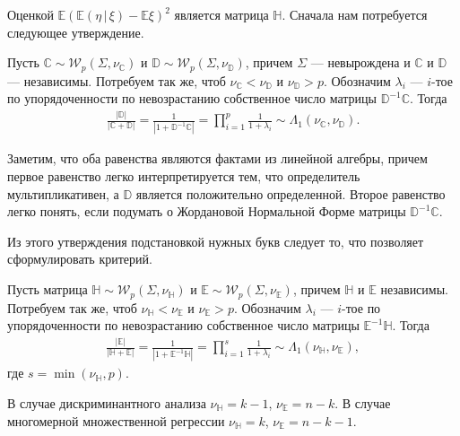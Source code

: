 Оценкой $\mathbb E(\mathbb E(\eta\, | \, \xi) - \mathbb E \xi)^2$ является матрица $\mathbb H$.
Сначала нам потребуется следующее утверждение.
\begin{thm}
    \label{Wilks-thm-gen}
    Пусть $\mathbb C \sim \mathcal W_p(\Sigma, \nu_\mathbb C)$ и
    $\mathbb D \sim \mathcal W_p(\Sigma, \nu_\mathbb D)$, причем $\Sigma$ --- невырождена
    и $\mathbb C$ и $\mathbb D$ --- независимы.
    Потребуем так же, чтоб $\nu_\mathbb C < \nu_\mathbb D$ и $\nu_\mathbb D > p$.
    Обозначим $\lambda_i$ --- $i$-тое по упорядоченности по невозрастанию собственное число матрицы $\mathbb D^{-1} \mathbb C$.
    Тогда
    \begin{gather*}
        \mathbb {\frac{|D|}{| C + D |}} = \frac{1}{| 1 + \mathbb D^{-1} \mathbb C|} = \prod_{i=1}^p {\frac{1}{1 + \lambda_i}}
    \sim \Lambda_1(\nu_\mathbb C, \nu_\mathbb D).
    \end{gather*}
\end{thm}

Заметим, что оба равенства являются фактами из линейной алгебры, причем первое равенство легко интерпретируется тем, что
определитель мультипликативен, а $\mathbb D$ является положительно определенной. Второе равенство легко понять, если подумать
о Жордановой Нормальной Форме матрицы $\mathbb D^{-1} \mathbb C$.

Из этого утверждения подстановкой нужных букв следует то, что позволяет сформулировать критерий.

\begin{thm}
    \label{Wilks-thm-conc}
    Пусть матрица $\mathbb H \sim \mathcal W_p(\Sigma, \nu_\mathbb H)$ и
    $\mathbb E \sim \mathcal W_p(\Sigma, \nu_\mathbb E)$, причем $\mathbb H$ и $\mathbb E$ независимы.
    Потребуем так же, чтоб $\nu_\mathbb H < \nu_\mathbb E$ и $\nu_\mathbb E > p$.
    Обозначим $\lambda_i$ --- $i$-тое по упорядоченности по невозрастанию собственное число матрицы $\mathbb E^{-1} \mathbb H$.
    Тогда
    \begin{gather*}
       \mathbb {\frac{|E|}{| H + E |}} = \frac{1}{| 1 + \mathbb E^{-1} \mathbb H|} = \prod_{i=1}^s {\frac{1}{1 + \lambda_i}}
    \sim \Lambda_1(\nu_\mathbb H, \nu_\mathbb E),
    \end{gather*}
    где $s = \min(\nu_\mathbb H, p)$.

    В случае дискриминантного анализа $\nu_\mathbb H = k - 1$, $\nu_\mathbb E = n - k$.
    В случае многомерной множественной регрессии $\nu_\mathbb H = k$, $\nu_\mathbb E = n - k - 1$.
\end{thm}

